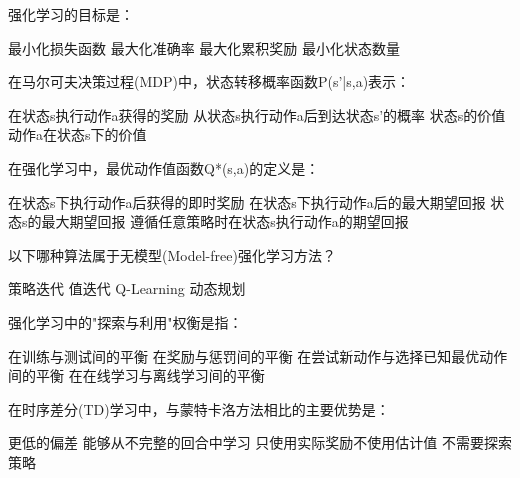 \documentclass[zihao=5,answers]{BHCexam}
\begin{document}
\renewcommand{\O}{\mathcal{O}}



\maketitle

\begin{questions}

\xuanze

\question 强化学习的目标是：
\begin{choices}
    \choice 最小化损失函数
    \choice 最大化准确率
    \CorrectChoice 最大化累积奖励
    \choice 最小化状态数量
\end{choices}

\question 在马尔可夫决策过程(MDP)中，状态转移概率函数P(s'|s,a)表示：
\begin{choices}
    \choice 在状态s执行动作a获得的奖励
    \CorrectChoice 从状态s执行动作a后到达状态s'的概率
    \choice 状态s的价值
    \choice 动作a在状态s下的价值
\end{choices}

\question 在强化学习中，最优动作值函数Q*(s,a)的定义是：
\begin{choices}
    \choice 在状态s下执行动作a后获得的即时奖励
    \CorrectChoice 在状态s下执行动作a后的最大期望回报
    \choice 状态s的最大期望回报
    \choice 遵循任意策略时在状态s执行动作a的期望回报
\end{choices}

\question 以下哪种算法属于无模型(Model-free)强化学习方法？
\begin{choices}
    \choice 策略迭代
    \choice 值迭代
    \CorrectChoice Q-Learning
    \choice 动态规划
\end{choices}

\question 强化学习中的"探索与利用"权衡是指：
\begin{choices}
    \choice 在训练与测试间的平衡
    \choice 在奖励与惩罚间的平衡
    \CorrectChoice 在尝试新动作与选择已知最优动作间的平衡
    \choice 在在线学习与离线学习间的平衡
\end{choices}

\question 在时序差分(TD)学习中，与蒙特卡洛方法相比的主要优势是：
\begin{choices}
    \choice 更低的偏差
    \CorrectChoice 能够从不完整的回合中学习
    \choice 只使用实际奖励不使用估计值
    \choice 不需要探索策略
\end{choices}


\end{questions}
\end{document}
